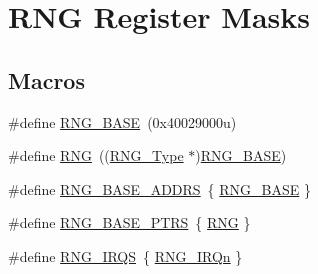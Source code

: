 \hypertarget{group___r_n_g___register___masks}{}\section{R\+NG Register Masks}
\label{group___r_n_g___register___masks}
\subsection*{Macros}
\begin{DoxyCompactItemize}
\item 
\#define \mbox{\hyperlink{group___r_n_g___register___masks_gab92662976cfe62457141e5b4f83d541c}{R\+N\+G\+\_\+\+B\+A\+SE}}~(0x40029000u)
\item 
\#define \mbox{\hyperlink{group___r_n_g___register___masks_ga5b0885b8b55bbc13691092b704d9309f}{R\+NG}}~((\mbox{\hyperlink{struct_r_n_g___type}{R\+N\+G\+\_\+\+Type}} $\ast$)\mbox{\hyperlink{group___r_n_g___register___masks_gab92662976cfe62457141e5b4f83d541c}{R\+N\+G\+\_\+\+B\+A\+SE}})
\item 
\#define \mbox{\hyperlink{group___r_n_g___register___masks_ga794b814e7cc50a77c3e540fb88945326}{R\+N\+G\+\_\+\+B\+A\+S\+E\+\_\+\+A\+D\+D\+RS}}~\{ \mbox{\hyperlink{group___r_n_g___register___masks_gab92662976cfe62457141e5b4f83d541c}{R\+N\+G\+\_\+\+B\+A\+SE}} \}
\item 
\#define \mbox{\hyperlink{group___r_n_g___register___masks_gafe29fd84164c78d03c9a7a2128caf361}{R\+N\+G\+\_\+\+B\+A\+S\+E\+\_\+\+P\+T\+RS}}~\{ \mbox{\hyperlink{group___r_n_g___register___masks_ga5b0885b8b55bbc13691092b704d9309f}{R\+NG}} \}
\item 
\#define \mbox{\hyperlink{group___r_n_g___register___masks_ga2ad5ec19e225454d775bec0771e14615}{R\+N\+G\+\_\+\+I\+R\+QS}}~\{ \mbox{\hyperlink{group___interrupt__vector__numbers_gga666eb0caeb12ec0e281415592ae89083a90c4647e57cff99fac635c532802c4b5}{R\+N\+G\+\_\+\+I\+R\+Qn}} \}
\end{DoxyCompactItemize}
